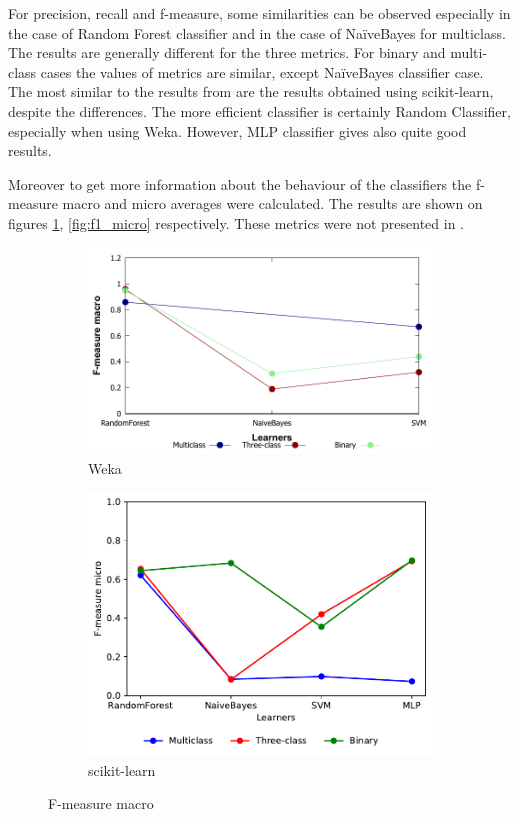 For precision, recall and f-measure, some similarities can be observed especially in the case of Random Forest classifier and in the case of NaïveBayes for multiclass. The results are generally different for the three metrics. For binary and multi-class cases the values of metrics are similar, except NaïveBayes classifier case. The most similar to the results from \cite{borges_hink_machine_2014-1} are the results obtained using scikit-learn, despite the differences. The more efficient classifier is certainly Random Classifier, especially when using Weka. However, MLP classifier gives also quite good results.

Moreover to get more information about the behaviour of the classifiers the f-measure macro and micro averages were calculated. The results are shown on figures \ref{fig:f1_macro}, \ref{fig:f1_micro} respectively. These metrics were not presented in \cite{borges_hink_machine_2014-1}.

\begin{figure}[H]
    \centering
    \begin{subfigure}[t]{0.5\textwidth}
        \includegraphics[width=\linewidth]{images/weka_f1macro}
        \caption{Weka}
    \end{subfigure}%
    \begin{subfigure}[t]{0.42\textwidth}
        \includegraphics[width=\linewidth, page = 2]{images/fmeasure}
        \caption{scikit-learn}
    \end{subfigure}
    \caption{F-measure macro}
    \label{fig:f1_macro}
\end{figure}

